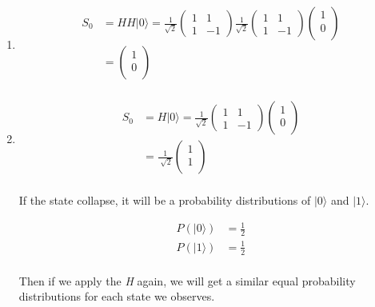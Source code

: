 \documentclass{article}%
\begin{document}
\begin{enumerate}
    \item \begin{align}
        S_0 &= H H |0\rangle = \frac{1}{\sqrt{2}}\begin{pmatrix}
                1 & 1 \\
                1 & -1
            \end{pmatrix} \frac{1}{\sqrt{2}}\begin{pmatrix}
                1 & 1 \\
                1 & -1
            \end{pmatrix} \begin{pmatrix}
                1 \\
                0 \\
            \end{pmatrix} \\
                &=\begin{pmatrix}
                    1 \\
                    0 \\
                \end{pmatrix} \\
    \end{align}

    \item \begin{align}
        S_0 &= H|0\rangle = \frac{1}{\sqrt{2}}\begin{pmatrix}
            1 & 1 \\
            1 & -1
        \end{pmatrix} \begin{pmatrix}
            1 \\
            0 \\
        \end{pmatrix} \\
            &=\frac{1}{\sqrt[]{2}}\begin{pmatrix}
                1 \\
                1 \\
            \end{pmatrix} \\
    \end{align}

    If the state collapse, it will be a probability distributions of $|0\rangle$ and $|1\rangle$.

    \begin{align}
        P(|0\rangle) &= \frac{1}{2} \\
        P(|1\rangle) &= \frac{1}{2} \\
    \end{align}

    Then if we apply the \textit{H} again, we will get a similar equal probability distributions for each state we observes.
\end{enumerate}
\end{document}
